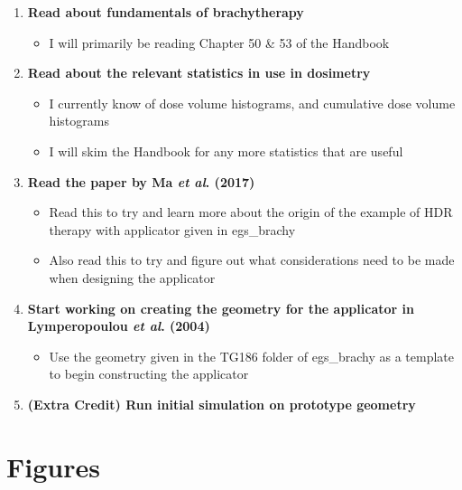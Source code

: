 \documentclass[12pt]{article}
\begin{document}
\begin{enumerate}
	\item \textbf{Read about fundamentals of brachytherapy}
	\begin{itemize}
		\item I will primarily be reading Chapter 50 \& 53 of the Handbook
	\end{itemize}
	\item \textbf{Read about the relevant statistics in use in dosimetry}
	\begin{itemize}
		\item I currently know of dose volume histograms, and cumulative dose volume histograms
		\item I will skim the Handbook for any more statistics that are useful 
	\end{itemize}
	\item \textbf{Read the paper by Ma \textit{et al}. (2017)}
	\begin{itemize}
		\item Read this to try and learn more about the origin of the example of HDR therapy with applicator given in egs\_brachy
		\item Also read this to try and figure out what considerations need to be made when designing the applicator
	\end{itemize}
	\item \textbf{Start working on creating the geometry for the applicator in Lymperopoulou \textit{et al}. (2004)}
	\begin{itemize}
		\item Use the geometry given in the TG186 folder of egs\_brachy as a template to begin constructing the applicator
	\end{itemize}
	\item \textbf{(Extra Credit) Run initial simulation on prototype geometry}	
\end{enumerate}

\section{Figures}
\end{document}
